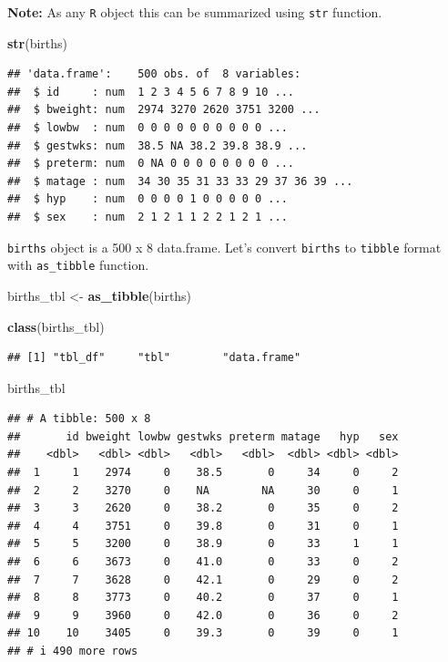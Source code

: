 \documentclass[
]{book}
\newenvironment{Shaded}{\begin{snugshade}}{\end{snugshade}}
\newcommand{\FunctionTok}[1]{\textcolor[rgb]{0.13,0.29,0.53}{\textbf{#1}}}
\newcommand{\NormalTok}[1]{#1}
\newcommand{\OtherTok}[1]{\textcolor[rgb]{0.56,0.35,0.01}{#1}}
\theoremstyle{definition}
\theoremstyle{definition}
\theoremstyle{definition}
\theoremstyle{definition}
\theoremstyle{remark}
\begin{document}
\textbf{Note:} As any \texttt{R} object this can be summarized using \texttt{str} function.

\begin{Shaded}
\begin{Highlighting}[]
\FunctionTok{str}\NormalTok{(births)}
\end{Highlighting}
\end{Shaded}

\begin{verbatim}
## 'data.frame':    500 obs. of  8 variables:
##  $ id     : num  1 2 3 4 5 6 7 8 9 10 ...
##  $ bweight: num  2974 3270 2620 3751 3200 ...
##  $ lowbw  : num  0 0 0 0 0 0 0 0 0 0 ...
##  $ gestwks: num  38.5 NA 38.2 39.8 38.9 ...
##  $ preterm: num  0 NA 0 0 0 0 0 0 0 0 ...
##  $ matage : num  34 30 35 31 33 33 29 37 36 39 ...
##  $ hyp    : num  0 0 0 0 1 0 0 0 0 0 ...
##  $ sex    : num  2 1 2 1 1 2 2 1 2 1 ...
\end{verbatim}

\texttt{births} object is a 500 x 8 data.frame.
Let's convert \texttt{births} to \texttt{tibble} format with \texttt{as\_tibble} function.

\begin{Shaded}
\begin{Highlighting}[]
\NormalTok{births\_tbl }\OtherTok{\textless{}{-}} \FunctionTok{as\_tibble}\NormalTok{(births)}

\FunctionTok{class}\NormalTok{(births\_tbl)}
\end{Highlighting}
\end{Shaded}

\begin{verbatim}
## [1] "tbl_df"     "tbl"        "data.frame"
\end{verbatim}

\begin{Shaded}
\begin{Highlighting}[]
\NormalTok{births\_tbl}
\end{Highlighting}
\end{Shaded}

\begin{verbatim}
## # A tibble: 500 x 8
##       id bweight lowbw gestwks preterm matage   hyp   sex
##    <dbl>   <dbl> <dbl>   <dbl>   <dbl>  <dbl> <dbl> <dbl>
##  1     1    2974     0    38.5       0     34     0     2
##  2     2    3270     0    NA        NA     30     0     1
##  3     3    2620     0    38.2       0     35     0     2
##  4     4    3751     0    39.8       0     31     0     1
##  5     5    3200     0    38.9       0     33     1     1
##  6     6    3673     0    41.0       0     33     0     2
##  7     7    3628     0    42.1       0     29     0     2
##  8     8    3773     0    40.2       0     37     0     1
##  9     9    3960     0    42.0       0     36     0     2
## 10    10    3405     0    39.3       0     39     0     1
## # i 490 more rows
\end{verbatim}
\end{document}
